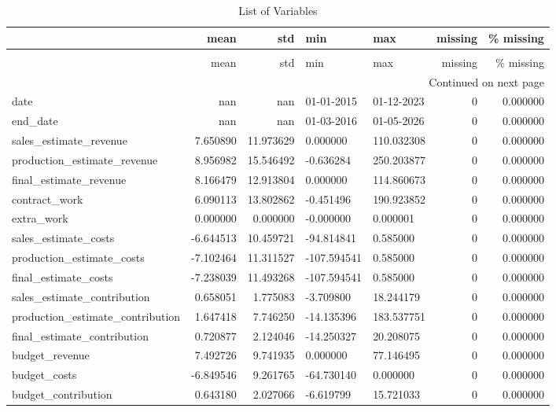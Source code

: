 \begin{landscape}\begin{longtable}[h!]{lrrllrr}
\caption{List of Variables} \label{eda_1} \\
\toprule
 & mean & std & min & max & missing & \% missing \\
\midrule
\endfirsthead
\caption[]{List of Variables} \\
\toprule
 & mean & std & min & max & missing & \% missing \\
\midrule
\endhead
\midrule
\multicolumn{7}{r}{Continued on next page} \\
\midrule
\endfoot
\bottomrule
\endlastfoot
date & nan & nan & 01-01-2015 & 01-12-2023 & 0 & 0.000000 \\
end_date & nan & nan & 01-03-2016 & 01-05-2026 & 0 & 0.000000 \\
sales_estimate_revenue & 7.650890 & 11.973629 & 0.000000 & 110.032308 & 0 & 0.000000 \\
production_estimate_revenue & 8.956982 & 15.546492 & -0.636284 & 250.203877 & 0 & 0.000000 \\
final_estimate_revenue & 8.166479 & 12.913804 & 0.000000 & 114.860673 & 0 & 0.000000 \\
contract_work & 6.090113 & 13.802862 & -0.451496 & 190.923852 & 0 & 0.000000 \\
extra_work & 0.000000 & 0.000000 & -0.000000 & 0.000001 & 0 & 0.000000 \\
sales_estimate_costs & -6.644513 & 10.459721 & -94.814841 & 0.585000 & 0 & 0.000000 \\
production_estimate_costs & -7.102464 & 11.311527 & -107.594541 & 0.585000 & 0 & 0.000000 \\
final_estimate_costs & -7.238039 & 11.493268 & -107.594541 & 0.585000 & 0 & 0.000000 \\
sales_estimate_contribution & 0.658051 & 1.775083 & -3.709800 & 18.244179 & 0 & 0.000000 \\
production_estimate_contribution & 1.647418 & 7.746250 & -14.135396 & 183.537751 & 0 & 0.000000 \\
final_estimate_contribution & 0.720877 & 2.124046 & -14.250327 & 20.208075 & 0 & 0.000000 \\
budget_revenue & 7.492726 & 9.741935 & 0.000000 & 77.146495 & 0 & 0.000000 \\
budget_costs & -6.849546 & 9.261765 & -64.730140 & 0.000000 & 0 & 0.000000 \\
budget_contribution & 0.643180 & 2.027066 & -6.619799 & 15.721033 & 0 & 0.000000 \\

\end{longtable}
\end{landscape}
